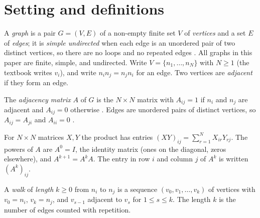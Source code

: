 \section{Setting and definitions}\label{sec:definitions}

\begin{definition}\label{def:graph}
A \emph{graph} is a pair $G = (V, E)$ of a non-empty finite set $V$ of \emph{vertices} and a set $E$ of \emph{edges}; it is \emph{simple undirected} when each edge is an unordered pair of two distinct vertices, so there are no loops and no repeated edges \cite[Definition 1.1.1, p.~9; Definition 1.1.4, p.~11]{petrosyan_graph_theory} \cite[Definition 1.1.1]{galway_adjacency_notes}. All graphs in this paper are finite, simple, and undirected. Write $V = \{n_1, \dots, n_N\}$ with $N \ge 1$ (the textbook writes $v_i$), and write $n_i n_j = n_j n_i$ for an edge. Two vertices are \emph{adjacent} if they form an edge.
\end{definition}

\begin{definition}\label{def:matrix}
The \emph{adjacency matrix} $A$ of $G$ is the $N \times N$ matrix with $A_{ij} = 1$ if $n_i$ and $n_j$ are adjacent and $A_{ij} = 0$ otherwise \cite[p.~11]{petrosyan_graph_theory}. Edges are unordered pairs of distinct vertices, so $A_{ij} = A_{ji}$ and $A_{ii} = 0$ \cite[p.~11]{petrosyan_graph_theory}.
\end{definition}

For $N \times N$ matrices $X, Y$ the product has entries $(XY)_{ij} = \sum_{r=1}^{N} X_{ir} Y_{rj}$. The powers of $A$ are $A^0 = I$, the identity matrix (ones on the diagonal, zeros elsewhere), and $A^{k+1} = A^k A$. The entry in row $i$ and column $j$ of $A^k$ is written $(A^k)_{ij}$.

\begin{definition}\label{def:walk}
A \emph{walk} of \emph{length} $k \ge 0$ from $n_i$ to $n_j$ is a sequence $(v_0, v_1, \dots, v_k)$ of vertices with $v_0 = n_i$, $v_k = n_j$, and $v_{s-1}$ adjacent to $v_s$ for $1 \le s \le k$. The length $k$ is the number of edges counted with repetition.
\end{definition}

